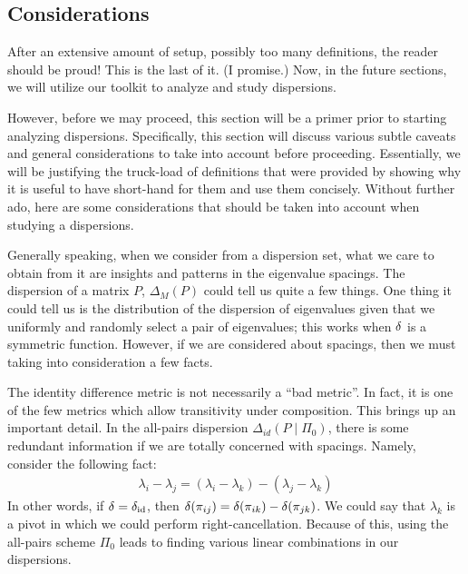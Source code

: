 \subsection{Considerations}

After an extensive amount of setup, possibly too many definitions, the reader should be proud! This is the last of it. (I promise.)
Now, in the future sections, we will utilize our toolkit to analyze and study dispersions. \newline

However, before we may proceed, this section will be a primer prior to starting analyzing dispersions.
Specifically, this section will discuss various subtle caveats and general considerations to take into account before proceeding.
Essentially, we will be justifying the truck-load of definitions that were provided by showing why it is useful to have short-hand for them and use them concisely.
Without further ado, here are some considerations that should be taken into account when studying a dispersions. \newline

Generally speaking, when we consider from a dispersion set, what we care to obtain from it are insights and patterns in the eigenvalue spacings.
The dispersion of a matrix $P$, $\Delta_M(P)$ could tell us quite a few things.
One thing it could tell us is the distribution of the dispersion of eigenvalues given that we uniformly and randomly select a pair of eigenvalues;
this works when $\delta$ is a symmetric function. However, if we are considered about spacings, then we must taking into consideration a few facts.
\newline
\medskip

 The identity difference metric is not necessarily a ``bad metric''.
In fact, it is one of the few metrics which allow transitivity under composition.
This brings up an important detail.
In the all-pairs dispersion $\Delta_{id}(P \mid \Pi_0)$, there is some redundant information if we are totally concerned with spacings. Namely, consider the following fact:
\begin{align*}
\lambda_i - \lambda_j = (\lambda_i - \lambda_k) - (\lambda_j - \lambda_k)
\end{align*}
In other words, if $\delta = \delta_{\text{id}}$, then $\delta(\pi_{ij}) = \delta(\pi_{ik}) - \delta(\pi_{jk})$.
We could say that $\lambda_k$ is a pivot in which we could perform right-cancellation.
Because of this, using the all-pairs scheme $\Pi_0$ leads to finding various linear combinations in our dispersions.
\newline
\medskip

